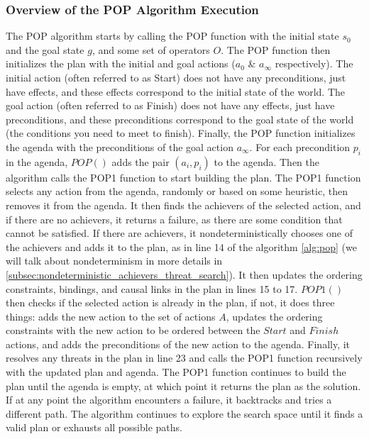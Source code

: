 \subsubsection{Overview of the POP Algorithm Execution} \label{subsubsec:pop_execution}
The \ac{POP} algorithm starts by calling the POP function with the initial state $s_0$ and the goal state $g$, and some set of operators $O$. The POP function then initializes the plan with the initial and goal actions ($a_0$ \& $a_{\infty}$ respectively). The initial action (often referred to as Start) does not have any preconditions, just have effects, and these effects correspond to the initial state of the world. The goal action (often referred to as Finish) does not have any effects, just have preconditions, and these preconditions correspond to the goal state of the world (the conditions you need to meet to finish). Finally, the POP function initializes the agenda with the preconditions of the goal action $a_{\infty}$. For each precondition $p_i$ in the agenda, \textbf{$POP()$} adds the pair $(a_i, p_i)$ to the agenda.
Then the algorithm calls the POP1 function to start building the plan. The POP1 function selects any action from the agenda, randomly or based on some heuristic, then removes it from the agenda. It then finds the achievers of the selected action, and if there are no achievers, it returns a failure, as there are some condition that cannot be satisfied. If there are achievers, it nondeterministically chooses one of the achievers and adds it to the plan, as in line 14 of the algorithm \ref{alg:pop} (we will talk about nondeterminism in more details in \ref{subsec:nondeterministic_achievers_threat_search}). It then updates the ordering constraints, bindings, and causal links in the plan in lines 15 to 17.
\textbf{$POP1()$} then checks if the selected action is already in the plan, if not, it does three things: adds the new action to the set of actions $A$, updates the ordering constraints with the new action to be ordered between the $Start$ and $Finish$ actions, and adds the preconditions of the new action to the agenda.
Finally, it resolves any threats in the plan in line 23 and calls the POP1 function recursively with the updated plan and agenda. The POP1 function continues to build the plan until the agenda is empty, at which point it returns the plan as the solution. If at any point the algorithm encounters a failure, it backtracks and tries a different path. The algorithm continues to explore the search space until it finds a valid plan or exhausts all possible paths.


